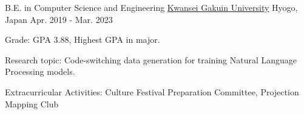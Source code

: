 

\begin{cventries}

  \cventry
    {B.E. in Computer Science and Engineering} %
    {\href{https://global.kwansei.ac.jp/}{Kwansei Gakuin University}} %
    {Hyogo, Japan} %
    {Apr. 2019 - Mar. 2023} %
    {
      \begin{cvitems} %
        \item {Grade: GPA 3.88, Highest GPA in major.}
        \item {Research topic: Code-switching data generation for training Natural Language Processing models.}
        \item {Extracurricular Activities: Culture Festival Preparation Committee, Projection Mapping Club}
      \end{cvitems}
    }

\end{cventries}
